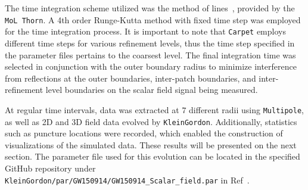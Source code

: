 The time integration scheme utilized was the method of lines~\cite{LeVeque_Randall_J_2007-09-06}, provided by the \texttt{MoL Thorn}. A 4th order Runge-Kutta method with fixed time step was employed for the time integration process. It is important to note that \texttt{Carpet} employs different time steps for various refinement levels, thus the time step specified in the parameter files pertains to the coarsest level. The final integration time was selected in conjunction with the outer boundary radius to minimize interference from reflections at the outer boundaries, inter-patch boundaries, and inter-refinement level boundaries on the scalar field signal being measured.

At regular time intervals, data was extracted at $7$ different radii using \texttt{Multipole}, as well as 2D and 3D field data evolved by \texttt{KleinGordon}. Additionally, statistics such as puncture locations were recorded, which enabled the construction of visualizations of the simulated data. These results will be presented on the next section. The parameter file used for this evolution can be located in the specified GitHub repository under \texttt{KleinGordon/par/GW150914/GW150914\_Scalar\_field.par} in Ref~\cite{FieldPerturbationsRepo}.